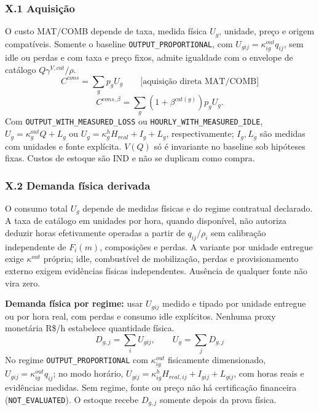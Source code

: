 \documentclass[
  10pt,
]{article}
\begin{document}
\hypertarget{x.1-aquisiuxe7uxe3o}{%
\subsubsection{X.1 Aquisição}\label{x.1-aquisiuxe7uxe3o}}

O custo MAT/COMB depende de taxa, medida física \(U_g\), unidade, preço e origem compatíveis. Somente o baseline \texttt{OUTPUT\_PROPORTIONAL}, com \(U_{gij}=\kappa_{ig}^{out}q_{ij}\), sem idle ou perdas e com taxa e preço fixos, admite igualdade com o envelope de catálogo \(Q\gamma^{V,cat}/\rho\).
\[\boxed{C^{cons}=\sum_gp_gU_g}\qquad\text{[aquisição direta MAT/COMB]}\]
\[C^{cons,\beta}=\sum_g(1+\beta^{cat(g)})p_gU_g.\]
Com \texttt{OUTPUT\_WITH\_MEASURED\_LOSS} ou \texttt{HOURLY\_WITH\_MEASURED\_IDLE}, \(U_g=\kappa_g^{out}Q+L_g\) ou \(U_g=\kappa_g^hH_{real}+I_g+L_g\), respectivamente; \(I_g,L_g\) são medidas com unidades e fonte explícita. \(V(Q)\) só é invariante no baseline sob hipóteses fixas. Custos de estoque são IND e não se duplicam como compra.

\hypertarget{x.2-demanda-fuxedsica-derivada}{%
\subsubsection{X.2 Demanda física
derivada}\label{x.2-demanda-fuxedsica-derivada}}

O consumo total \(U_g\) depende de medidas físicas e do regime contratual declarado. A taxa de catálogo em unidades por hora, quando disponível, não autoriza deduzir horas efetivamente operadas a partir de \(q_{ij}/\rho_i\) sem calibração independente de \(F_i(m)\), composições e perdas. A variante por unidade entregue exige \(\kappa^{out}\) própria; idle, combustível de mobilização, perdas e provisionamento externo exigem evidências físicas independentes. Ausência de qualquer fonte não vira zero.

\textbf{Demanda física por regime:} usar \(U_{gij}\) medido e tipado por unidade entregue ou por hora real, com perdas e consumo idle explícitos. Nenhuma proxy monetária R\$/h estabelece quantidade física.
\[\boxed{D_{g,j}=\sum_iU_{gij},\qquad U_g=\sum_jD_{g,j}}\]
No regime \texttt{OUTPUT\_PROPORTIONAL} com \(\kappa_{ig}^{out}\) fisicamente dimensionado, \(U_{gij}=\kappa_{ig}^{out}q_{ij}\); no modo horário, \(U_{gij}=\kappa_{ig}^hH_{real,ij}+I_{gij}+L_{gij}\), com horas reais e evidências medidas. Sem regime, fonte ou preço não há certificação financeira (\texttt{NOT\_EVALUATED}). O estoque recebe \(D_{g,j}\) somente depois da prova física.
\end{document}
